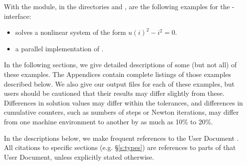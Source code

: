 With the {\fkinsol} module, in the directories 
 and
, are the following examples for
the {\F}-{\C} interface:
\begin{itemize}
\item {}
  solves a nonlinear system of the form $u(i)^2 - i^2 = 0$.
\item {}
  a parallel implementation of .
\end{itemize}

In the following sections, we give detailed descriptions of some (but
not all) of these examples.  The Appendices contain complete listings
of those examples described below.  We also give our output files for
each of these examples, but users should be cautioned that their
results may differ slightly from these.  Differences in solution
values may differ within the tolerances, and differences in cumulative
counters, such as numbers of steps or Newton iterations, may differ
from one machine environment to another by as much as 10\% to 20\%.

In the descriptions below, we make frequent references to the {\kinsol}
User Document \cite{kinsol2.2.0_ug}.  All citations to specific sections
(e.g. \S\ref{s:types}) are references to parts of that User Document, unless
explicitly stated otherwise.
